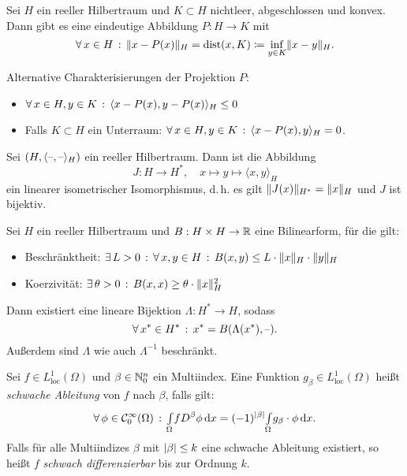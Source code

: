 \documentclass{cheat-sheet}
\DeclareMathOperator{\dist}{dist} %
\newcommand{\scp}[2]{\langle #1 , #2 \rangle} %
\begin{document}
\begin{satz}[Projektionssatz]
  Sei $H$ ein reeller Hilbertraum und $K \subset H$ nichtleer, abgeschlossen und konvex. Dann gibt es eine eindeutige Abbildung $P : H \to K$ mit
  \[ \fa{x \in H} \norm{x - P(x)}_H = \dist(x, K) \coloneqq \inf_{y \in K} \norm{x - y}_H. \]
\end{satz}

\begin{bem}
  Alternative Charakterisierungen der Projektion $P$:
  \begin{itemize}
    \item $\fa{x \in H, y \in K} \scp{x - P(x)}{y - P(x)}_H \leq 0$
    \item Falls $K \subset H$ ein Unterraum: $\fa{x \in H, y \in K} \scp{x - P(x)}{y}_H = 0$.
  \end{itemize}
\end{bem}

\begin{satz}
  Sei $(H, \scp{\blank}{\blank}_H)$ ein reeller Hilbertraum. Dann ist die Abbildung
  \[
    J : H \to H^*, \quad
    x \mapsto y \mapsto \scp{x}{y}_H
  \]
  ein linearer isometrischer Isomorphismus, d.\,h. es gilt $\lVert J(x)\rVert_{H^*} = \lVert x\rVert_H$ und $J$ ist bijektiv.
\end{satz}

\begin{satz}
  Sei $H$ ein reeller Hilbertraum und $B : H \times H \to \mathbb{R}$ eine Bilinearform, für die gilt:
  \begin{itemize}
    \item Beschränktheit: $\exists \, {L > 0} \,:\, \forall \, {x, y \in H} \,:\, B(x, y) \leq L \cdot \lVert x\rVert_H \cdot \lVert y\rVert_H$
    \item Koerzivität: $\exists \, {\theta > 0} \,:\, B(x, x) \geq \theta \cdot \lVert x\rVert_H^2$
  \end{itemize}
  Dann existiert eine lineare Bijektion $\Lambda : H^* \to H$, sodass
  \[ \forall \, {x^* \in H^*} \,:\, x^* = B(\Lambda(x^*), \text{--}). \]
  Außerdem sind $\Lambda$ wie auch $\Lambda^{-1}$ beschränkt.
\end{satz}


\begin{defn}
  Sei $f \in L^1_{\text{loc}}(\Omega)$ und $\beta \in \mathbb{N}_0^n$ ein Multiindex. Eine Funktion $g_\beta \in L^1_{\text{loc}}(\Omega)$ heißt \emph{schwache Ableitung} von $f$ nach $\beta$, falls gilt:
  \[
    \forall \, {\phi \in \mathcal{C}_0^\infty(\Omega)} \,:\,
    {\textstyle \int\limits_{\Omega}^{}} f D^\beta \phi \,\mathrm{d} x = (-1)^{\lvert\beta\rvert} {\textstyle \int\limits_{\Omega}^{}} g_\beta \cdot \phi \,\mathrm{d} x.
  \]
  Falls für alle Multiindizes $\beta$ mit $\lvert\beta\rvert \leq k$ eine schwache Ableitung existiert, so heißt $f$ \emph{schwach differenzierbar} bis zur Ordnung $k$.
\end{defn}
\end{document}
